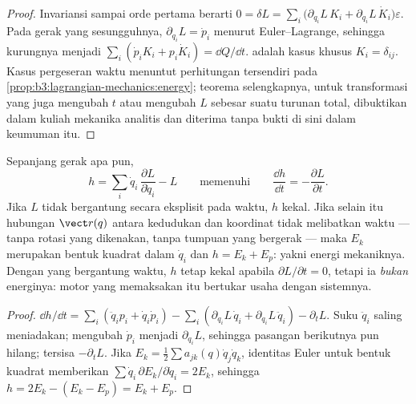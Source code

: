 \begin{proof}
Invariansi sampai orde pertama berarti
$0 = \delta L = \sum_i\big(\partial_{q_i}L\,K_i +
\partial_{\dot q_i}L\,\dot K_i\big)\varepsilon$. Pada gerak yang
sesungguhnya, $\partial_{q_i}L = \dot p_i$ menurut Euler--Lagrange,
sehingga kurungnya menjadi
$\sum_i(\dot p_iK_i + p_i\dot K_i) = \dd Q/\dd t$. 
adalah kasus khusus $K_i = \delta_{ij}$. Kasus pergeseran waktu menuntut
perhitungan tersendiri pada
\cref{prop:b3:lagrangian-mechanics:energy}; teorema selengkapnya, untuk
transformasi yang juga mengubah $t$ atau mengubah $L$ sebesar suatu
turunan total, dibuktikan dalam kuliah mekanika analitis dan diterima
tanpa bukti di sini dalam keumuman itu.
\end{proof}

\begin{proposition}\label{prop:b3:lagrangian-mechanics:energy}
Sepanjang gerak apa pun, \emph{}
\[
h = \sum_i \dot q_i\,\frac{\partial L}{\partial\dot q_i} - L
\qquad\text{memenuhi}\qquad
\frac{\dd h}{\dd t} = -\frac{\partial L}{\partial t} .
\]
Jika $L$ tidak bergantung secara eksplisit pada waktu, $h$ kekal. Jika
selain itu hubungan $\vect r(q)$ antara kedudukan dan koordinat tidak
melibatkan waktu --- tanpa rotasi yang dikenakan, tanpa tumpuan yang
bergerak --- maka $E_k$ merupakan bentuk kuadrat dalam $\dot q_i$ dan
$h = E_k + E_p$: yakni energi mekaniknya. Dengan  yang bergantung
waktu, $h$ tetap kekal apabila $\partial L/\partial t = 0$, tetapi ia
\emph{bukan} energinya: motor yang memaksakan  itu bertukar usaha
dengan sistemnya.
\end{proposition}

\begin{proof}
$\dd h/\dd t = \sum_i(\ddot q_ip_i + \dot q_i\dot p_i) -
\sum_i(\partial_{q_i}L\,\dot q_i + \partial_{\dot q_i}L\,\ddot q_i) -
\partial_tL$. Suku $\ddot q_i$ saling meniadakan;  mengubah $\dot p_i$ menjadi $\partial_{q_i}L$, sehingga
pasangan berikutnya pun hilang; tersisa $-\partial_tL$. Jika
$E_k = \tfrac12\sum a_{jk}(q)\dot
q_j\dot q_k$, identitas Euler untuk bentuk kuadrat memberikan $\sum\dot
q_i\,\partial E_k/\partial\dot q_i = 2E_k$, sehingga $h = 2E_k - (E_k - E_p)
= E_k + E_p$.
\end{proof}

